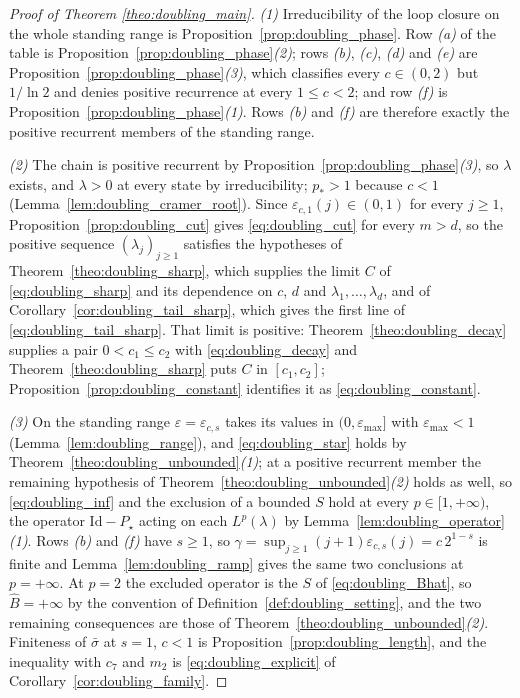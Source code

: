 \begin{proof}[Proof of Theorem \ref{theo:doubling_main}]
\emph{(1)} Irreducibility of the loop closure on the whole standing range is
Proposition~\ref{prop:doubling_phase}. Row \emph{(a)} of the table is
Proposition~\ref{prop:doubling_phase}\emph{(2)}; rows \emph{(b)}, \emph{(c)}, \emph{(d)} and
\emph{(e)} are Proposition~\ref{prop:doubling_phase}\emph{(3)}, which classifies every
$c\in(0,2)$ but $1/\ln2$ and denies positive recurrence at every $1\leq c<2$; and row
\emph{(f)} is Proposition~\ref{prop:doubling_phase}\emph{(1)}. Rows \emph{(b)} and \emph{(f)}
are therefore exactly the positive recurrent members of the standing range.

\emph{(2)} The chain is positive recurrent by
Proposition~\ref{prop:doubling_phase}\emph{(3)}, so $\lambda$ exists, and $\lambda>0$ at every
state by irreducibility; $p_*>1$ because $c<1$ (Lemma~\ref{lem:doubling_cramer_root}). Since
$\varepsilon_{c,1}(j)\in(0,1)$ for every $j\geq1$, Proposition~\ref{prop:doubling_cut} gives
\eqref{eq:doubling_cut} for every $m>d$, so the positive sequence $(\lambda_j)_{j\geq1}$
satisfies the hypotheses of Theorem~\ref{theo:doubling_sharp}, which supplies the limit $C$ of
\eqref{eq:doubling_sharp} and its dependence on $c$, $d$ and $\lambda_1,\dots,\lambda_d$, and
of Corollary~\ref{cor:doubling_tail_sharp}, which gives the first line of
\eqref{eq:doubling_tail_sharp}. That limit is positive: Theorem~\ref{theo:doubling_decay}
supplies a pair $0<c_1\leq c_2$ with \eqref{eq:doubling_decay} and
Theorem~\ref{theo:doubling_sharp} puts $C$ in $[c_1,c_2]$;
Proposition~\ref{prop:doubling_constant} identifies it as
\eqref{eq:doubling_constant}.

\emph{(3)} On the standing range $\varepsilon=\varepsilon_{c,s}$ takes its values in
$(0,\varepsilon_{\max}]$ with $\varepsilon_{\max}<1$ (Lemma~\ref{lem:doubling_range}),
and \eqref{eq:doubling_star} holds by
Theorem~\ref{theo:doubling_unbounded}\emph{(1)}; at a positive recurrent member the remaining
hypothesis of Theorem~\ref{theo:doubling_unbounded}\emph{(2)} holds as well, so
\eqref{eq:doubling_inf} and the exclusion of a bounded $S$
hold at every $p\in[1,+\infty)$, the operator $\mathrm{Id}-P_\star$ acting on each
$L^p(\lambda)$ by Lemma~\ref{lem:doubling_operator}\emph{(1)}. Rows \emph{(b)} and \emph{(f)}
have $s\geq1$, so $\gamma=\sup_{j\geq1}(j+1)\varepsilon_{c,s}(j)=c\,2^{1-s}$ is
finite and Lemma~\ref{lem:doubling_ramp} gives the same two conclusions at $p=+\infty$. At
$p=2$ the excluded operator is the $S$ of \eqref{eq:doubling_Bhat}, so $\widehat B=+\infty$ by
the convention of Definition~\ref{def:doubling_setting}, and the two remaining consequences are
those of Theorem~\ref{theo:doubling_unbounded}\emph{(2)}. Finiteness of $\bar\sigma$ at $s=1$,
$c<1$ is
Proposition~\ref{prop:doubling_length}, and the inequality with $c_7$ and $m_2$ is
\eqref{eq:doubling_explicit} of Corollary~\ref{cor:doubling_family}.


\end{proof}

